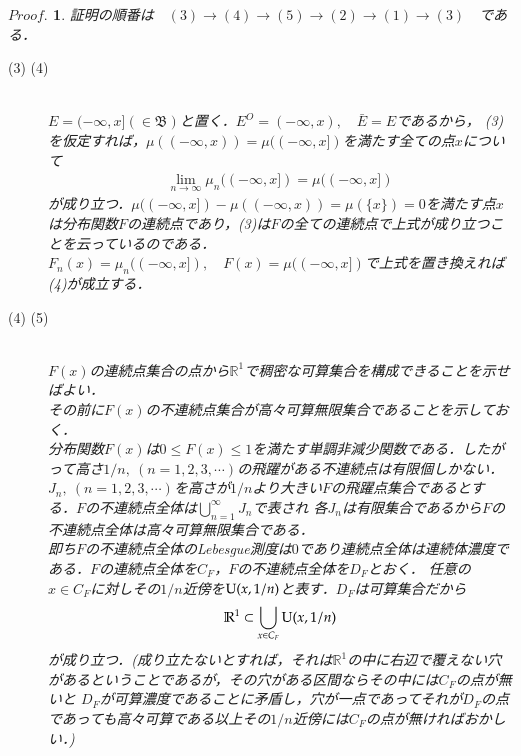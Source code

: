 \documentclass[a4j,papersize,disablejfam,slide,14pt]{jsarticle}
\newtheorem{Proof}{$Proof.$}
\begin{document}
    \begin{Proof}
    	証明の順番は$\quad (3) \to (4) \to (5) \to (2) \to (1) \to (3) \quad$である．
        \begin{description}
        	\item[{\large (3) \to (4)}]\mbox{}\\
            	$E = (-\infty, x] (\in \mathfrak{B})$と置く．$E^O = (-\infty, x),\quad \bar{E} = E$であるから，
                (3)を仮定すれば，$\mu((-\infty, x)) = \mu((-\infty, x])$を満たす全ての点$x$について
                \begin{align}
                	\lim_{n \to \infty} \mu_n((-\infty, x]) = \mu((-\infty, x])
                \end{align}
                が成り立つ．$\mu((-\infty, x]) - \mu((-\infty, x)) = \mu(\{x\}) = 0$を満たす点$x$は分布関数$F$の連続点であり，(3)は$F$の全ての連続点で上式が成り立つことを云っているのである．
                $F_n(x) = \mu_n((-\infty, x]),\quad F(x) = \mu((-\infty, x])$で上式を置き換えれば(4)が成立する．
            \item[{\large (4) \to (5)}]\mbox{}\\
            	$F(x)$の連続点集合の点から$\mathbb{R}^1$で稠密な可算集合を構成できることを示せばよい．\\
                その前に$F(x)$の不連続点集合が高々可算無限集合であることを示しておく．\\
                分布関数$F(x)$は$0 \leq F(x) \leq 1$を満たす単調非減少関数である．したがって高さ$1/n,\ (n=1,2,3,\cdots)$の飛躍がある不連続点は有限個しかない．
                $J_n,\ (n=1,2,3,\cdots)$を高さが$1/n$より大きい$F$の飛躍点集合であるとする．$F$の不連続点全体は$\bigcup_{n=1}^{\infty} J_n$で表され
                各$J_n$は有限集合であるから$F$の不連続点全体は高々可算無限集合である．\\
                即ち$F$の不連続点全体の{\rm Lebesgue}測度は$0$であり連続点全体は連続体濃度である．$F$の連続点全体を$C_F$，$F$の不連続点全体を$D_F$とおく．
                任意の$x \in C_F$に対しその$1/n$近傍を${\rm U}(x, 1/n)$と表す．$D_F$は可算集合だから
                \begin{align}
                	\mathbb{R}^1 \subset \bigcup_{x \in C_F} {\rm U}(x, 1/n)
                \end{align}
                が成り立つ．(成り立たないとすれば，それは$\mathbb{R}^1$の中に右辺で覆えない穴があるということであるが，その穴がある区間ならその中には$C_F$の点が無いと
                $D_F$が可算濃度であることに矛盾し，穴が一点であってそれが$D_F$の点であっても高々可算である以上その$1/n$近傍には$C_F$の点が無ければおかしい．)

\end{description}
\end{Proof}
\end{document}
